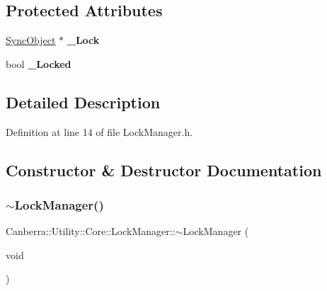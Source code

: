 \subsection*{Protected Attributes}
\begin{DoxyCompactItemize}
\item 
\mbox{\label{class_canberra_1_1_utility_1_1_core_1_1_lock_manager_ae877c649dea45a4dc3d3614ed9cb0bab}} 
\hyperlink{class_canberra_1_1_utility_1_1_core_1_1_sync_object}{Sync\+Object} $\ast$ {\bfseries \+\_\+\+Lock}
\item 
\mbox{\label{class_canberra_1_1_utility_1_1_core_1_1_lock_manager_ac639b36e2c1974512be13007e055e285}} 
bool {\bfseries \+\_\+\+Locked}
\end{DoxyCompactItemize}


\subsection{Detailed Description}


Definition at line 14 of file Lock\+Manager.\+h.



\subsection{Constructor \& Destructor Documentation}
\mbox{\label{class_canberra_1_1_utility_1_1_core_1_1_lock_manager_abd2f0fbc6748df132a6e347207702a8e_abd2f0fbc6748df132a6e347207702a8e}} 
\subsubsection{\texorpdfstring{$\sim$\+Lock\+Manager()}{~LockManager()}}
{\footnotesize\ttfamily Canberra\+::\+Utility\+::\+Core\+::\+Lock\+Manager\+::$\sim$\+Lock\+Manager (\begin{DoxyParamCaption}\item[{void}]{ }\end{DoxyParamCaption})\hspace{0.3cm}{\ttfamily [virtual]}}

